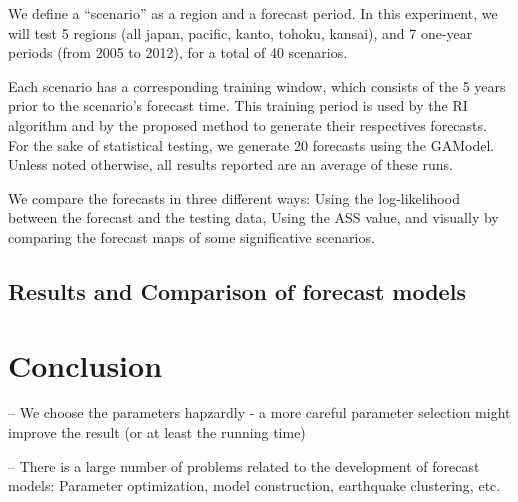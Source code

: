 \documentclass{sig-alternate}
\begin{document}
We define a ``scenario'' as a region and a forecast period. In this
experiment, we will test 5 regions (all japan, pacific, kanto, tohoku,
kansai), and 7 one-year periods (from 2005 to 2012), for a total of 40
scenarios.

Each scenario has a corresponding training window, which consists of
the 5 years prior to the scenario's forecast time. This training
period is used by the RI algorithm and by the proposed method to
generate their respectives forecasts. For the sake of statistical
testing, we generate 20 forecasts using the GAModel. Unless noted
otherwise, all results reported are an average of these runs.

We compare the forecasts in three different ways: Using the
log-likelihood between the forecast and the testing data, Using the
ASS value, and visually by comparing the forecast maps of some
significative scenarios.

\subsection{Results and Comparison of forecast models}






\section{Conclusion}


-- We choose the parameters hapzardly - a more careful parameter
selection might improve the result (or at least the running time)


-- There is a large number of problems related to the development of
forecast models: Parameter optimization, model construction,
earthquake clustering, etc.
\end{document}
